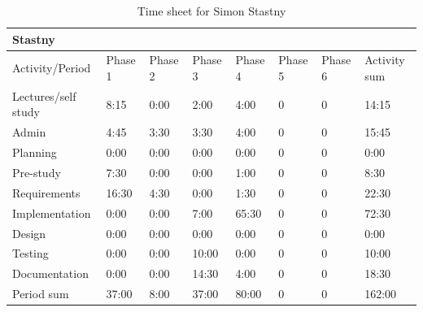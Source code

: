 \documentclass[11pt]{book}
\begin{document}
\begin{table}[H]
\centering
\begin{tabular}{| l | l | l | l | l | l | l | l |}
    \hline
    Stastny             &          &          &          &          &             &             &                 \\ \hline          
    Activity/Period     & Phase 1  & Phase 2  & Phase  3 & Phase 4  & Phase 5     & Phase 6     & Activity sum    \\ \hline
    Lectures/self study & 8:15     & 0:00     & 2:00     & 4:00     & 0           & 0           & 14:15        \\ \hline
    Admin               & 4:45     & 3:30     & 3:30     & 4:00     & 0           & 0           & 15:45        \\ \hline
    Planning            & 0:00     & 0:00     & 0:00     & 0:00     & 0           & 0           & 0:00         \\ \hline
    Pre-study           & 7:30     & 0:00     & 0:00     & 1:00     & 0           & 0           & 8:30         \\ \hline
    Requirements        & 16:30    & 4:30     & 0:00     & 1:30     & 0           & 0           & 22:30        \\ \hline
    Implementation      & 0:00     & 0:00     & 7:00     & 65:30    & 0           & 0           & 72:30        \\ \hline
    Design              & 0:00     & 0:00     & 0:00     & 0:00     & 0           & 0           & 0:00         \\ \hline
    Testing             & 0:00     & 0:00     & 10:00    & 0:00     & 0           & 0           & 10:00        \\ \hline
    Documentation       & 0:00     & 0:00     & 14:30    & 4:00     & 0           & 0           & 18:30        \\ \hline
    Period sum          & 37:00    & 8:00     & 37:00    & 80:00    & 0           & 0           & 162:00       \\ \hline
\end{tabular}
\caption{Time sheet for Simon Stastny}
\label{tab:appendix_timesheets_simon}
\end{table}
\end{document}
